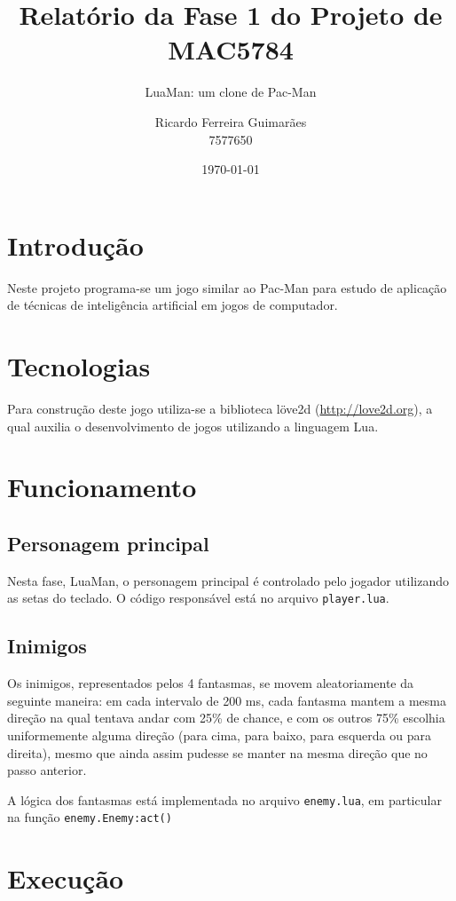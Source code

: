 \documentclass[a4paper]{scrartcl}
\title{Relatório da Fase 1 do Projeto de MAC5784}
\subtitle{LuaMan: um clone de Pac-Man}
\author{Ricardo Ferreira Guimarães \\ 7577650}
\date{\today}
\begin{document}
\maketitle

\section{Introdução}

Neste projeto programa-se um jogo similar ao Pac-Man para estudo de aplicação de
técnicas de inteligência artificial em jogos de computador.

\section{Tecnologias}

Para construção deste jogo utiliza-se a biblioteca löve2d (\url{http://love2d.org}),
a qual auxilia o desenvolvimento de jogos utilizando a linguagem Lua.

\section{Funcionamento}

\subsection{Personagem principal}

Nesta fase, LuaMan, o personagem principal é controlado pelo jogador utilizando as setas do teclado.
O código responsável está no arquivo \texttt{player.lua}.

\subsection{Inimigos}

Os inimigos, representados pelos 4 fantasmas, se movem aleatoriamente da seguinte maneira: em cada
intervalo de 200 ms,
cada fantasma mantem a mesma direção na qual tentava andar com 25\% de chance, e com os outros 75\%
escolhia uniformemente alguma direção (para cima, para baixo, para esquerda ou para direita), mesmo
que ainda assim pudesse se manter na mesma direção que no passo anterior.

A lógica dos fantasmas está implementada no arquivo \texttt{enemy.lua}, em particular na função
\texttt{enemy.Enemy:act()}

\section{Execução}
\end{document}
